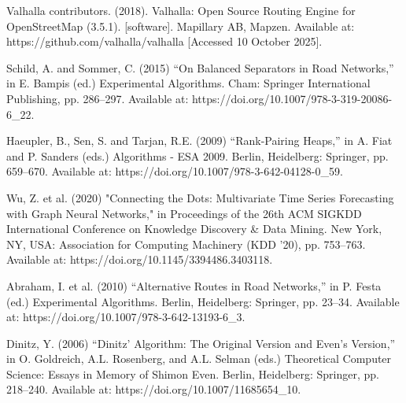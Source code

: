 \begin{thebibliography}{99}
       Valhalla contributors. (2018). Valhalla: Open Source Routing Engine for OpenStreetMap (3.5.1). [software]. Mapillary AB, Mapzen. Available at: https://github.com/valhalla/valhalla [Accessed 10 October 2025].

       Schild, A. and Sommer, C. (2015) “On Balanced Separators in Road Networks,” in E. Bampis (ed.) Experimental Algorithms. Cham: Springer International Publishing, pp. 286–297. Available at: https://doi.org/10.1007/978-3-319-20086-6\_22.

    Haeupler, B., Sen, S. and Tarjan, R.E. (2009) “Rank-Pairing Heaps,” in A. Fiat and P. Sanders (eds.) Algorithms - ESA 2009. Berlin, Heidelberg: Springer, pp. 659–670. Available at: https://doi.org/10.1007/978-3-642-04128-0\_59.

    Wu, Z. et al. (2020) "Connecting the Dots: Multivariate Time Series Forecasting with Graph Neural Networks," in Proceedings of the 26th ACM SIGKDD International Conference on Knowledge Discovery \& Data Mining. New York, NY, USA: Association for Computing Machinery (KDD '20), pp. 753–763. Available at: https://doi.org/10.1145/3394486.3403118.

    Abraham, I. et al. (2010) “Alternative Routes in Road Networks,” in P. Festa (ed.) Experimental Algorithms. Berlin, Heidelberg: Springer, pp. 23–34. Available at: https://doi.org/10.1007/978-3-642-13193-6\_3.

    Dinitz, Y. (2006) “Dinitz’ Algorithm: The Original Version and Even’s Version,” in O. Goldreich, A.L. Rosenberg, and A.L. Selman (eds.) Theoretical Computer Science: Essays in Memory of Shimon Even. Berlin, Heidelberg: Springer, pp. 218–240. Available at: https://doi.org/10.1007/11685654\_10.



\end{thebibliography}   
